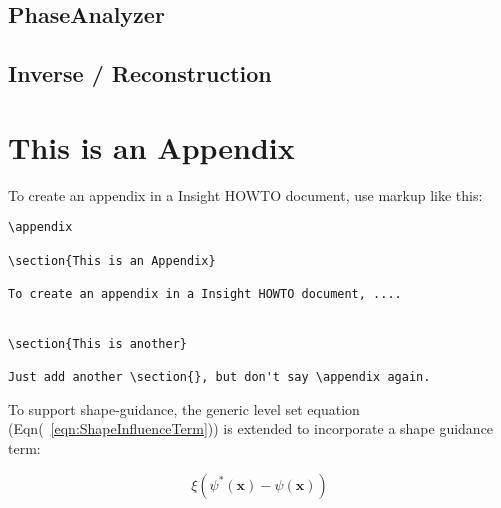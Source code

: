 \documentclass{InsightArticle}
\theoremstyle{definition}
\begin{document}
\subsection{PhaseAnalyzer}

\subsection{Inverse / Reconstruction}
\label{sub:Inverse}


\appendix

\section{This is an Appendix}

To create an appendix in a Insight HOWTO document, use markup like
this:

\begin{verbatim}
\appendix

\section{This is an Appendix}

To create an appendix in a Insight HOWTO document, ....


\section{This is another}

Just add another \section{}, but don't say \appendix again.
\end{verbatim}


%
%


%
%


To support shape-guidance, the generic level set equation
(Eqn(~\ref{eqn:ShapeInfluenceTerm})) is extended to incorporate a shape guidance
term:

\begin{equation}
\label{eqn:ShapeInfluenceTerm}
\xi \left(\psi^{*}(\mathbf{x}) - \psi(\mathbf{x})\right)
\end{equation}

%
%
\nocite{*} %

\twocolumn

\onecolumn
\end{document}
